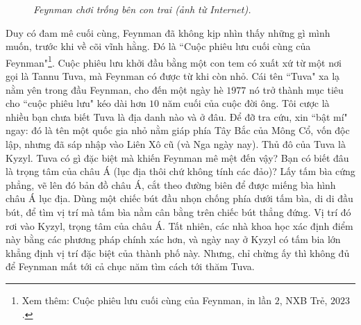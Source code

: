 \begin{multicols}{2}
\begin{figure}[H]
		\caption{\small\textit{\color{quantoan}Feynman chơi trống bên con trai (ảnh từ Internet).}}
		\vspace*{-10pt}
	\end{figure}
	Duy có đam mê cuối cùng, Feynman đã không kịp nhìn thấy những gì mình muốn, trước khi về cõi vĩnh hằng. Đó là ``Cuộc phiêu lưu cuối cùng của Feynman"\footnote[2]{\color{quantoan}Xem thêm: Cuộc phiêu lưu cuối cùng của Feynman, in lần $2$, NXB Trẻ, $2023$.}. Cuộc phiêu lưu khởi đầu bằng một con tem có xuất xứ từ một nơi gọi là Tannu Tuva, mà Feynman có được từ khi còn nhỏ. Cái tên ``Tuva" xa lạ nằm yên trong đầu Feynman, cho đến một ngày hè $1977$ nó trở thành mục tiêu cho ``cuộc phiêu lưu" kéo dài hơn $10$ năm cuối của cuộc đời ông. Tôi cược là nhiều bạn chưa biết Tuva là địa danh nào và ở đâu. Để đỡ tra cứu, xin ``bật mí" ngay: đó là tên một quốc gia nhỏ nằm giáp phía Tây Bắc của Mông Cổ, vốn độc lập, nhưng đã sáp nhập vào Liên Xô cũ (và Nga ngày nay). Thủ đô của Tuva là Kyzyl. Tuva có gì đặc biệt mà khiến Feynman mê mệt đến vậy?
	\vskip 0.1cm
	Bạn có biết đâu là trọng tâm của châu Á (lục địa thôi chứ không tính các đảo)? Lấy tấm bìa cứng phẳng, vẽ lên đó bản đồ châu Á, cắt theo đường biên để được miếng bìa hình châu Á lục địa. Dùng một chiếc bút đầu nhọn chống phía dưới tấm bìa, di di đầu bút, để tìm vị trí mà tấm bìa nằm cân bằng trên chiếc bút thẳng đứng. Vị trí đó rơi vào Kyzyl, trọng tâm của châu Á. Tất nhiên, các nhà khoa học xác định điểm này bằng các phương pháp chính xác hơn, và ngày nay ở Kyzyl có tấm bia lớn khẳng định vị trí đặc biệt của thành phố này. Nhưng, chỉ chừng ấy thì không đủ để Feynman mất tới cả chục năm tìm cách tới thăm Tuva.
	\begin{figure}[H]
		\vspace*{-5pt}
		\centering
		\captionsetup{labelformat= empty, justification=centering}

\end{figure}
\end{multicols}
